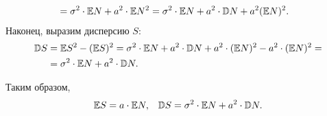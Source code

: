 \documentclass[../main.tex]{subfiles}
\begin{document}
\begin{exmpl}
\begin{itemize}
\begin{align*}
    &= \sigma^{2} \cdot \mathbb E N + a^{2}\cdot\mathbb E N^{2} = \sigma^{2}\cdot\mathbb E N + a^{2} \cdot \mathbb D N + a^{2}(\mathbb E N)^{2}.
   \end{align*} Наконец, выразим дисперсию $ S $:
   \begin{align*}
    \mathbb D S &= \mathbb E S^{2} - (\mathbb E S)^{2} = \sigma^{2} \cdot \mathbb E N + a^{2}\cdot\mathbb D N + a^{2}\cdot(\mathbb E N)^{2} - a^{2}\cdot(\mathbb E N)^{2} = \\
    &= \sigma^{2}\cdot\mathbb E N + a^{2} \cdot \mathbb D N.
   \end{align*}
 \end{itemize} Таким образом,
 \begin{align*}
  \mathbb E S = a \cdot \mathbb E N, && \mathbb D S = \sigma^{2} \cdot \mathbb E N + a^{2} \cdot \mathbb D N.
 \end{align*}
\end{exmpl}
\end{document}
